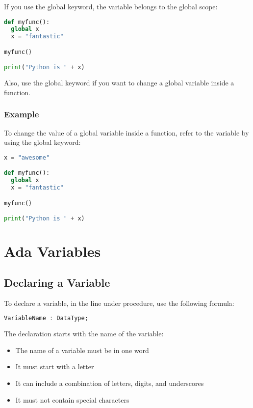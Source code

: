 \documentclass[12pt]{book}
\begin{document}
If you use the global keyword, the variable belongs to the global scope:


\lstset{style=mystyle}
\begin{lstlisting}[language=Python, caption=Python example]
def myfunc():
  global x
  x = "fantastic"

myfunc()

print("Python is " + x)
\end{lstlisting}



Also, use the global keyword if you want to change a global variable inside a function.




\subsubsection{Example}

To change the value of a global variable inside a function, refer to the variable by using the global keyword:


\lstset{style=mystyle}
\begin{lstlisting}[language=Python, caption=Python example]
x = "awesome"

def myfunc():
  global x
  x = "fantastic"

myfunc()

print("Python is " + x)
\end{lstlisting}




\section{Ada Variables}


\subsection{Declaring a Variable}

To declare a variable, in the line under procedure, use the following formula:

\lstset{style=mystyle}
\begin{lstlisting}[language=Ada, caption=Ada example]
VariableName : DataType;
\end{lstlisting}

The declaration starts with the name of the variable:

\begin{itemize}
	\item The name of a variable must be in one word
	\item It must start with a letter
	\item It can include a combination of letters, digits, and underscores
	\item It must not contain special characters
\end{itemize}
\end{document}
